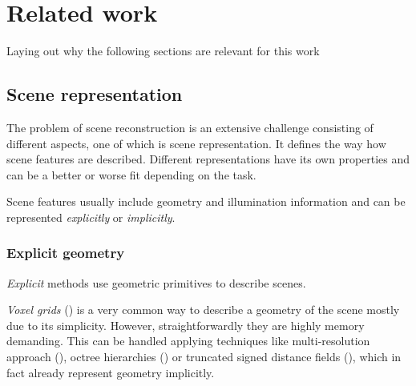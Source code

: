 \chapter{Related work}
\label{chap:related_work}


Laying out why the following sections are relevant for this work




\section{Scene representation}

The problem of scene reconstruction is an extensive challenge consisting of different aspects,
one of which is scene representation.
It defines the way how scene features are described.
Different representations have its own properties and can be a better or worse fit depending on the task.

Scene features usually include geometry and illumination information
and can be represented \textit{explicitly} or \textit{implicitly}.

\subsection{Explicit geometry}

\textit{Explicit} methods use geometric primitives to describe scenes.

\textit{Voxel grids} (\cite{Lombardi_2019}) is a very common way to describe a geometry of the scene mostly due to its simplicity.
However, straightforwardly they are highly memory demanding.
This can be handled applying techniques like multi-resolution approach (\cite{häne2017hierarchical}), octree hierarchies (\cite{riegler2017octnet, tatarchenko2017octree})
or truncated signed distance fields (\cite{truncdistfield1996curless}),
which in fact already represent geometry implicitly.

